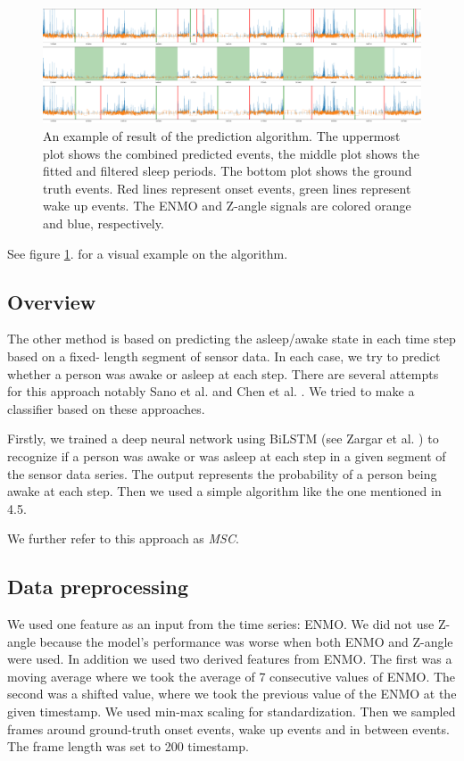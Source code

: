 \documentclass{article}
\begin{document}
\begin{figure}
    \centering
    \includegraphics[width=\textwidth]{cpd_prediction_plot.png}
    \caption{An example of result of the prediction algorithm. The uppermost plot shows the combined predicted events, the middle plot shows the fitted and filtered sleep periods. The bottom plot shows the ground truth events. Red lines represent onset events, green lines represent wake up events. The ENMO and Z-angle signals are colored orange and blue, respectively.}
    \label{fig:cpd-prediction-algorithm}
\end{figure}

See figure \ref{fig:cpd-prediction-algorithm}. for a visual example on the algorithm.

\subsection{Overview}

The other method is based on predicting the asleep/awake state in each time step based on a fixed-
length segment of sensor data. In each case, we try to predict whether a person was awake or asleep at each step. There are several attempts for this approach notably Sano et al. \cite{sano19} and Chen et al. \cite{chen21}. We tried to make a classifier based on these approaches.

Firstly, we trained a deep neural network using BiLSTM (see Zargar et al. \cite{zargar21}) to recognize if a person was awake or was asleep at each step in a given segment of the sensor data series. The output represents the probability of a person being awake at each step. Then we used a simple algorithm like the one mentioned in 4.5.

We further refer to this approach as \textit{MSC}.

\subsection{Data preprocessing}
We used one feature as an input from the time series: ENMO. We did not use Z-angle because the model's performance was worse when both ENMO and Z-angle were used. In addition we used two derived features from ENMO. The first was a moving average where we took the average of 7 consecutive values of ENMO. The second was a shifted value, where we took the previous value of the ENMO at the given timestamp. We used min-max scaling for standardization. Then we sampled frames around ground-truth onset events, wake up events and in between events. The frame length was set to 200 timestamp.
\end{document}
